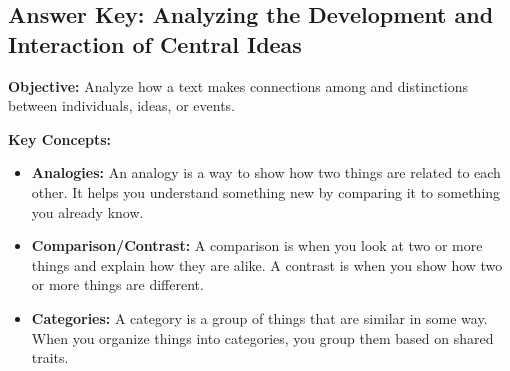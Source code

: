 \documentclass[12pt]{article}
\title{}
\date{}
\begin{document}
\subsection*{Answer Key: Analyzing the Development and Interaction of Central Ideas}
\onehalfspacing

\begin{tcolorbox}[colframe=black!40, colback=gray!5, 
coltitle=black, colbacktitle=black!20, fonttitle=\bfseries\Large, 
title=Learning Objective, halign title=center, left=5pt, right=5pt, top=5pt, bottom=15pt]
\textbf{Objective:} Analyze how a text makes connections among and distinctions between individuals, ideas, or events.
\end{tcolorbox}

\vspace{1em}

\begin{tcolorbox}[colframe=black!60, colback=white, 
coltitle=black, colbacktitle=black!15, fonttitle=\bfseries\Large, 
title=Key Concepts and Vocabulary, halign title=center, left=10pt, right=10pt, top=10pt, bottom=15pt]
\textbf{Key Concepts:}
\begin{itemize}
    \item \textbf{Analogies:} An analogy is a way to show how two things are related to each other. It helps you understand something new by comparing it to something you already know.
    \item \textbf{Comparison/Contrast:} A comparison is when you look at two or more things and explain how they are alike. A contrast is when you show how two or more things are different.
    \item \textbf{Categories:} A category is a group of things that are similar in some way. When you organize things into categories, you group them based on shared traits.
\end{itemize}
\end{tcolorbox}

\vspace{1em}
\end{document}
